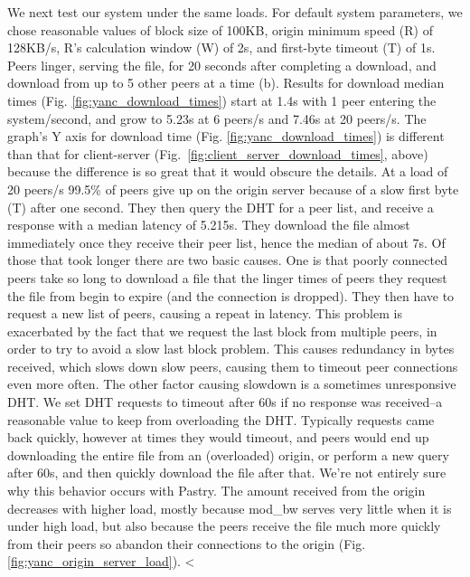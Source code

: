 We next test our system under the same loads. For default system parameters, we chose reasonable values 
of block size of 100KB, origin minimum speed (R) of 128KB/s, R's calculation window (W) 
of 2s, and first-byte timeout (T) of 1s. Peers linger, serving the file, for 20 seconds after completing 
a download, and download from up to 5 other peers at a time (b). Results for download median times 
(Fig. \ref{fig:yanc_download_times}) start at 1.4s with 1 peer entering the system/second, and grow 
to 5.23s at 6 peers/s and 7.46s at 20 peers/s. The graph's Y axis for download time (Fig. \ref{fig:yanc_download_times}) 
is different than that for client-server (Fig.~\ref{fig:client_server_download_times}, above) 
because the difference is so great that it would obscure the details. At a load of 20 peers/s 99.5\% 
of peers give up on the origin server because of a slow first byte (T) after one second. They then query the 
DHT for a peer list, and receive a response with a median latency of 5.215s.  They download the file almost 
immediately once they receive their peer list, hence the median of about 7s. Of those that took longer 
there are two basic causes. One is that poorly connected peers take so long to download a file 
that the linger times of peers they request the file from begin to expire (and the connection is dropped).   They then have to request a new 
list of peers, causing a repeat in latency.  This problem is exacerbated by the fact that we request 
the last block from multiple peers, in order to try to avoid a slow last block problem.  This causes 
redundancy in bytes received, which slows down slow peers, causing them to timeout peer 
connections even more often. The other factor causing slowdown is a sometimes unresponsive DHT. We 
set DHT requests to timeout after 60s if no response was received--a reasonable value to keep from 
overloading the DHT. Typically requests came back quickly, however at times they would timeout, 
and peers would end up downloading the entire file from an (overloaded) origin, or perform a new 
query after 60s, and then quickly download the file after that.  We're not entirely sure why this behavior occurs with Pastry.
The amount received from the origin decreases with higher load, mostly because mod\_bw serves 
very little when it is under high load, but also because the peers receive the file much more quickly 
from their peers so abandon their connections to the origin (Fig. \ref{fig:yanc_origin_server_load}). 
<%

